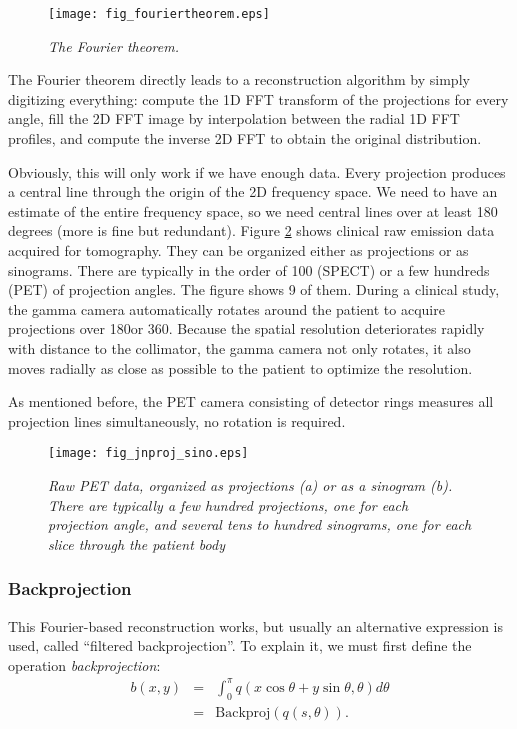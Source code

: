 \begin{figure}[tb]
\centering
\texttt{[image: fig\_fouriertheorem.eps]}
\caption{\label{fig:fouriertheorem} \emph{The Fourier theorem.}}
\end{figure}

The Fourier theorem directly leads to a reconstruction algorithm by simply
digitizing everything: compute the 1D FFT transform of the projections for
every angle, fill the 2D FFT image by interpolation between the radial 1D FFT
profiles, and compute the inverse 2D FFT to obtain the original distribution.

Obviously, this will only work if we have enough data. Every projection
produces a central line through the origin of the 2D frequency space. We need
to have an estimate of the entire frequency space, so we need central lines
over at least 180 degrees (more is fine but redundant).  Figure
\ref{fig:jnproj_sino} shows clinical raw emission data acquired for
tomography. They can be organized either as projections or as
sinograms. There are typically in the order of 100 (SPECT) or a few hundreds
(PET) of projection angles. The figure shows 9 of them. During a clinical
study, the gamma camera automatically rotates around the patient to acquire
projections over 180\degrees or 360\degrees. Because the spatial resolution
deteriorates rapidly with distance to the collimator, the gamma camera not
only rotates, it also moves radially as close as possible to the patient to
optimize the resolution.

As mentioned before, the PET camera consisting of detector rings measures all
projection lines simultaneously, no rotation is required.

\begin{figure}[tb]
\centering
\texttt{[image: fig\_jnproj\_sino.eps]}
\caption{\label{fig:jnproj_sino} \emph{Raw PET data, organized as projections
(a) or as a sinogram (b). There are typically a few hundred projections, one
for each projection angle, and several tens to hundred sinograms, one
for each slice through the patient body}}
\end{figure}


\subsubsection{Backprojection \label{sec:backprojection}}
This Fourier-based reconstruction works, but usually an alternative expression
is used, called ``filtered backprojection''. To explain it, we must first define
the operation {\em backprojection}:
\begin{eqnarray}
 b(x,y) & = & \int_0^\pi q(x \cos \theta + y \sin \theta, \theta) d \theta
             \nonumber\\
      & = & \mbox{Backproj} \left( q(s, \theta) \right). \label{eq:jnbackproj}
\end{eqnarray}

